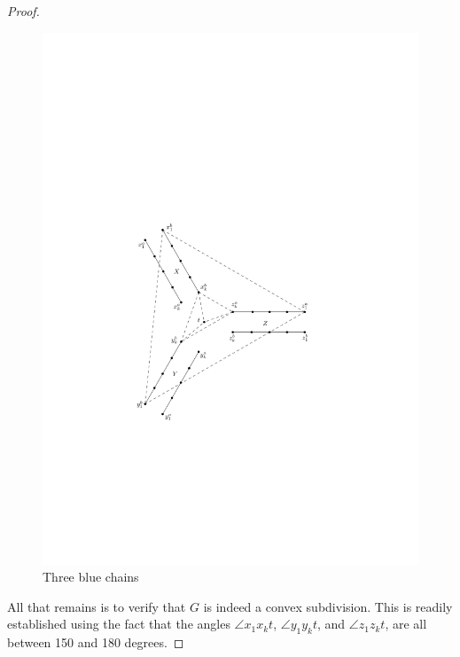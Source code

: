 \documentclass [letterpaper] {patmorin}
\begin{document}
\begin{proof}
\begin{figure}[ht]
  \centering
  \includegraphics{pics/3blue.pdf}
  \caption{Three blue chains}
  \label{fig:3blue}
\end{figure}

All that remains is to verify that $G$ is indeed a convex subdivision.  This is
readily established using the fact that the angles $\angle x_1 x_k t$, $\angle y_1 y_k t$, and $\angle z_1 z_k t$, are all between 150 and 180 degrees.
%
%
%
%
%
%
\end{proof}
\end{document}
